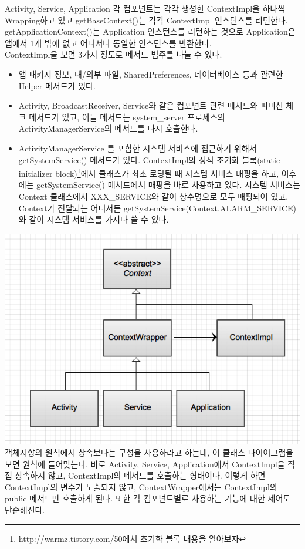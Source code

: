 Activity, Service, Application 각 컴포넌트는 각각 생성한 ContextImpl을 하나씩 Wrapping하고 있고 getBaseContext()는 각각 ContextImpl 인스턴스를 리턴한다. getApplicationContext()는 Application 인스턴스를 리턴하는 것으로 Application은 앱에서 1개 밖에 없고 어디서나 동일한 인스턴스를 반환한다.\\

ContextImpl을 보면 3가지 정도로 메서드 범주를 나눌 수 있다.
\begin{itemize}
\item 앱 패키지 정보, 내/외부 파일, SharedPreferences, 데이터베이스 등과 관련한 Helper 메서드가 있다. 
\item Activity, BroadcastReceiver, Service와 같은 컴포넌트 관련 메서드와 퍼미션 체크 메서드가 있고, 이들 메서드는 system\_server 프로세스의 ActivityManagerService의 메서드를 다시 호출한다. 
\item ActivityManagerService 를 포함한 시스템 서비스에 접근하기 위해서 getSystemService() 메서드가 있다. ContextImpl의 정적 초기화 블록(static initializer block)\footnote{http://warmz.tistory.com/50에서 초기화 블록 내용을 알아보자}에서 클래스가 최초 로딩될 때 시스템 서비스 매핑을 하고, 이후에는 getSystemService() 메서드에서 매핑을 바로 사용하고 있다.
시스템 서비스는 Context 클래스에서 XXX\_SERVICE와 같이 상수명으로 모두 매핑되어 있고, Context가 전달되는 어디서든 getSystemService(Context.ALARM\_SERVICE)와 같이 시스템 서비스를 가져다 쓸 수 있다.
\end{itemize}

\includegraphics[scale=0.5]{context}\\
객체지향의 원칙에서 상속보다는 구성을 사용하라고 하는데, 이 클래스 다이어그램을 보면 원칙에 들어맞는다.
바로 Activity, Service, Application에서 ContextImpl을 직접 상속하지 않고, ContextImpl의 메서드를 호출하는 형태이다. 이렇게 하면 ContextImpl의 변수가 노출되지 않고, ContextWrapper에서는 ContextImpl의 public 메서드만 호출하게 된다. 또한 각 컴포넌트별로 사용하는 기능에 대한 제어도 단순해진다.\\


